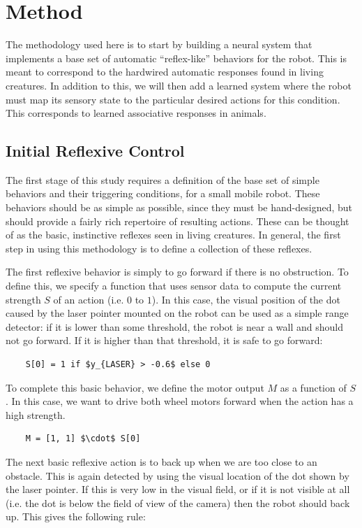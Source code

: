 \documentclass[conference]{IEEEtran}
\begin{document}
\section{Method}

The methodology used here is to start by building a neural system that
implements a base set of automatic ``reflex-like'' behaviors for the robot.
This is meant to correspond to the hardwired automatic responses found in
living creatures.  In addition to this, we will then add a learned system
where the robot must map its sensory state to the particular desired actions
for this condition.  This corresponds to learned associative responses
in animals.

\subsection{Initial Reflexive Control}
The first stage of this study requires a definition of the base set of simple 
behaviors and their triggering conditions, for a small mobile robot. These 
behaviors should be as simple as possible, since they must be hand-designed, 
but should provide a fairly rich repertoire of resulting actions. These can be 
thought of as the basic, instinctive reflexes seen in living creatures. In
general, the first step in using this methodology is to define a collection
of these reflexes.

The first reflexive behavior is simply to go forward if there is no 
obstruction. To define this, we specify a function that uses sensor data to 
compute the current strength $S$ of an action (i.e. $0$ to $1$). In this 
case, the visual position of the dot caused by the laser pointer mounted on
the robot can be used as a simple range 
detector: if it is lower than some threshold, the robot is near a wall and 
should not go forward. If it is higher than that threshold, it is safe to 
go forward: 

\begin{lstlisting}
	S[0] = 1 if $y_{LASER} > -0.6$ else 0
\end{lstlisting}

To complete this basic behavior, we define the motor output $M$ as a 
function of $S$. In this case, we want to drive both wheel motors forward 
when the action has a high strength.

\begin{lstlisting}
	M = [1, 1] $\cdot$ S[0]
\end{lstlisting}

The next basic reflexive action is to back up when we are too close to an 
obstacle. This is again detected by using the visual location of the dot
shown by the laser pointer.  If this is very low in the visual field, or if
it is not visible at all (i.e. the dot is below the field of view of the camera)
then the robot should back up.  This gives the following rule:
\end{document}

